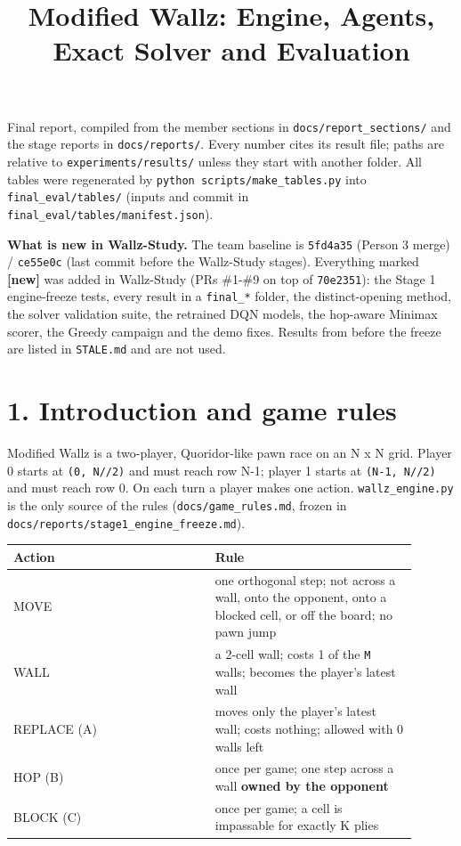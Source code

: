 \documentclass[11pt]{article}
\title{Modified Wallz: Engine, Agents, Exact Solver and Evaluation}
\date{}
\begin{document}
\maketitle

Final report, compiled from the member sections in \texttt{docs/report\_sections/} and the stage
reports in \texttt{docs/reports/}. Every number cites its result file; paths are relative to
\texttt{experiments/results/} unless they start with another folder. All tables were regenerated by
\texttt{python scripts/make\_tables.py} into \texttt{final\_eval/tables/} (inputs and commit in
\texttt{final\_eval/tables/manifest.json}).

\textbf{What is new in Wallz-Study.} The team baseline is \texttt{5fd4a35} (Person 3 merge) /
\texttt{ce55e0c} (last commit before the Wallz-Study stages). Everything marked \textbf{[new]} was added in
Wallz-Study (PRs \#1-\#9 on top of \texttt{70e2351}): the Stage 1 engine-freeze tests, every result in a
\texttt{final\_*} folder, the distinct-opening method, the solver validation suite, the retrained DQN
models, the hop-aware Minimax scorer, the Greedy campaign and the demo fixes. Results from
before the freeze are listed in \texttt{STALE.md} and are not used.

\section{1. Introduction and game rules}

Modified Wallz is a two-player, Quoridor-like pawn race on an N x N grid. Player 0 starts at
\texttt{(0, N//2)} and must reach row N-1; player 1 starts at \texttt{(N-1, N//2)} and must reach row 0.
On each turn a player makes one action. \texttt{wallz\_engine.py} is the only source of the rules
(\texttt{docs/game\_rules.md}, frozen in \texttt{docs/reports/stage1\_engine\_freeze.md}).

\begin{center}\scriptsize
\begin{longtable}{p{0.45\linewidth}p{0.45\linewidth}}
\toprule
Action & Rule \\
\midrule
MOVE & one orthogonal step; not across a wall, onto the opponent, onto a blocked cell, or off the board; no pawn jump \\
WALL & a 2-cell wall; costs 1 of the \texttt{M} walls; becomes the player's latest wall \\
REPLACE (A) & moves only the player's latest wall; costs nothing; allowed with 0 walls left \\
HOP (B) & once per game; one step across a wall \textbf{owned by the opponent} \\
BLOCK (C) & once per game; a cell is impassable for exactly K plies \\
\bottomrule
\end{longtable}
\end{center}
\end{document}
